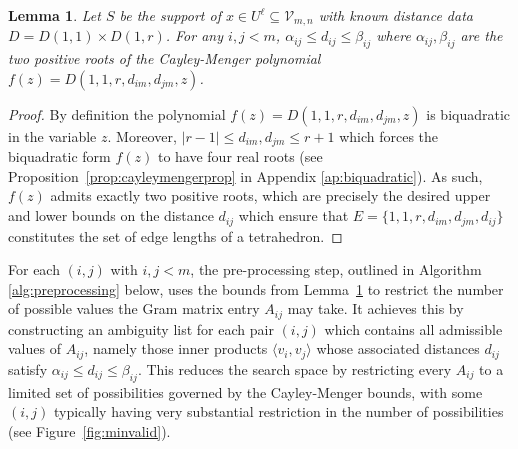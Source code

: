 \documentclass{article}
\newtheorem{Lemma}{Lemma}
\theoremstyle{definition}
\newcommand{\ip}[2]{\langle {#1}, {#2} \rangle}
\renewcommand{\|}{|}
\begin{document}
\begin{Lemma}\label{lem:cayleymengerlemma}
    Let $S$ be the support of $x \in U^\ell \subseteq \mathcal{V}_{m,n}$ with known distance data $D=D(1,1)\times D(1,r)$. For any $i,j<m$,  $\alpha_{ij} \leq d_{ij} \leq \beta_{ij}$ where $\alpha_{ij}, \beta_{ij}$ are the two positive roots 
    of the Cayley-Menger polynomial $f(z) = D(1,1,r,d_{im}, d_{jm}, z)$.
\end{Lemma}

\begin{proof}
By definition the polynomial $f(z) = D(1,1,r,d_{im},d_{jm}, z)$ is biquadratic in the variable $z$. Moreover, $|r-1| \leq d_{im}, d_{jm} \leq r+1$ which forces the biquadratic form $f(z)$ to have four real roots (see Proposition~\ref{prop:cayleymengerprop} in Appendix \ref{ap:biquadratic}). As such, $f(z)$ admits exactly two positive roots, which are precisely the desired upper and lower bounds on the distance $d_{ij}$ which ensure that $E = \{1, 1,r, d_{im}, d_{jm}, d_{ij}\}$ constitutes the set of edge lengths of a tetrahedron.
\end{proof}

For each $(i,j)$ with $i,j<m$, the pre-processing step, outlined in Algorithm \ref{alg:preprocessing} below, uses the bounds from Lemma~\ref{lem:cayleymengerlemma} to restrict the number of possible values the Gram matrix entry $A_{ij}$ may take. It achieves this by constructing an ambiguity list for each pair $(i,j)$ which contains all admissible values of $A_{ij}$, namely those inner products $\ip{v_i}{v_j}$ whose associated distances $d_{ij}$ satisfy $\alpha_{ij} \le d_{ij} \le \beta_{ij}$. This reduces the search space by restricting every $A_{ij}$ to a limited set of possibilities governed by the Cayley-Menger bounds, with some $(i,j)$ typically having very substantial restriction in the number of possibilities (see Figure~\ref{fig:minvalid}).
\end{document}
